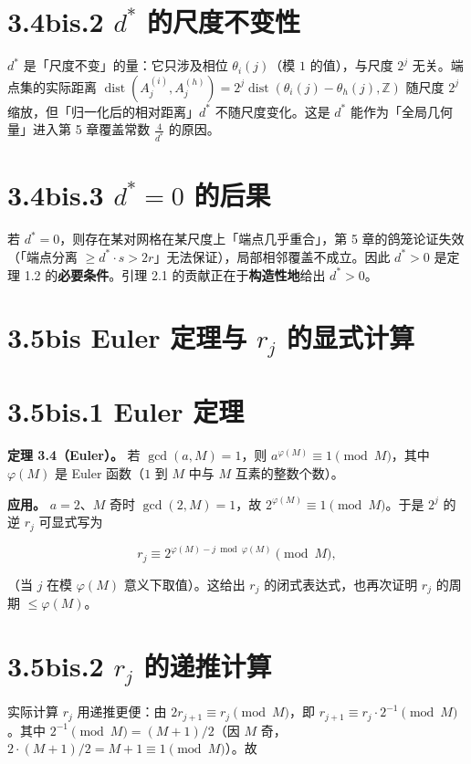 \documentclass[a4paper,11pt,openany]{ctexbook}
\numberwithin{equation}{chapter}
\numberwithin{figure}{chapter}
\numberwithin{table}{chapter}
\begin{document}
\section{3.4bis.2 $d^*$ 的尺度不变性}

$d^*$ 是「尺度不变」的量：它只涉及相位 $\theta_i(j)$（模 $1$ 的值），与尺度 $2^j$ 无关。端点集的实际距离 $\operatorname{dist}(A_j^{(i)},A_j^{(h)})=2^j\operatorname{dist}(\theta_i(j)-\theta_h(j),\mathbb Z)$ 随尺度 $2^j$ 缩放，但「归一化后的相对距离」$d^*$ 不随尺度变化。这是 $d^*$ 能作为「全局几何量」进入第 5 章覆盖常数 $\frac4{d^*}$ 的原因。

\section{3.4bis.3 $d^*=0$ 的后果}

若 $d^*=0$，则存在某对网格在某尺度上「端点几乎重合」，第 5 章的鸽笼论证失效（「端点分离 $\ge d^*\cdot s>2r$」无法保证），局部相邻覆盖不成立。因此 $d^*>0$ 是定理 1.2 的\textbf{必要条件}。引理 2.1 的贡献正在于\textbf{构造性地}给出 $d^*>0$。

\section{3.5bis Euler 定理与 $r_j$ 的显式计算}

\section{3.5bis.1 Euler 定理}

\textbf{定理 3.4（Euler）。} 若 $\gcd(a,M)=1$，则 $a^{\varphi(M)}\equiv1\pmod M$，其中 $\varphi(M)$ 是 Euler 函数（$1$ 到 $M$ 中与 $M$ 互素的整数个数）。

\textbf{应用。} $a=2$、$M$ 奇时 $\gcd(2,M)=1$，故 $2^{\varphi(M)}\equiv1\pmod M$。于是 $2^j$ 的逆 $r_j$ 可显式写为

$$r_j\equiv 2^{\varphi(M)-j\bmod\varphi(M)}\pmod M,$$

（当 $j$ 在模 $\varphi(M)$ 意义下取值）。这给出 $r_j$ 的闭式表达式，也再次证明 $r_j$ 的周期 $\le\varphi(M)$。

\section{3.5bis.2 $r_j$ 的递推计算}

实际计算 $r_j$ 用递推更便：由 $2r_{j+1}\equiv r_j\pmod M$，即 $r_{j+1}\equiv r_j\cdot2^{-1}\pmod M$。其中 $2^{-1}\pmod M=(M+1)/2$（因 $M$ 奇，$2\cdot(M+1)/2=M+1\equiv1\pmod M$）。故
\end{document}
